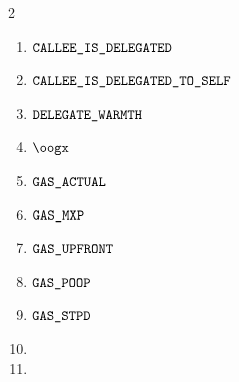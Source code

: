 \begin{description}
\begin{multicols}{2}
\begin{enumerate}
				\item $\texttt{CALLEE\_IS\_DELEGATED}$
				\item $\texttt{CALLEE\_IS\_DELEGATED\_TO\_SELF}$
				\item $\texttt{DELEGATE\_WARMTH}$
				\item $\oogx$
				\item $\texttt{GAS}\texttt{\_ACTUAL}$
				\item $\texttt{GAS}\texttt{\_MXP}$
				\item $\texttt{GAS}\texttt{\_UPFRONT}$
				\item $\texttt{GAS}\texttt{\_POOP}$
				\item $\texttt{GAS}\texttt{\_STPD}$
				\item[\vspace{\fill}]
				\item[\vspace{\fill}]
			\end{enumerate}
		\end{multicols}
\end{description}
